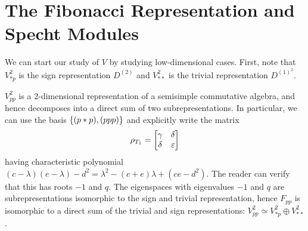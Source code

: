 \documentclass{amsart}
\begin{document}
\section{The Fibonacci Representation and Specht Modules}
We can start our study of $V$ by studying low-dimensional cases.
First, note that $V_{*p}^2$ is the sign representation $D^{(2)}$ and $V_{**}^2$ is the trivial representation $D^{(1)^2}$.

$V_{pp}^2$ is a 2-dimensional representation of a semisimple commutative algebra, and hence decomposes into a direct sum of two subrepresentations.
In particular, we can use the basis $\left\{ (p*p),(ppp) \right\}$ and explicitly write the matrix
\[
  \rho_{T_1} = \begin{bmatrix}
    \gamma & \delta\\
    \delta & \varepsilon
  \end{bmatrix}
\]
having characteristic polynomial $(c - \lambda)(e - \lambda) - d^2 = \lambda^2 - (c + e)\lambda +(ce - d^2)$.
The reader can verify that this has roots $-1$ and $q$.
The eigenspaces with eigenvalues $-1$ and $q$ are subrepresentations isomorphic to the sign and trivial representation, hence $F_{pp}$ is isomorphic to a direct sum of the trivial and sign representations: $V^2_{pp} \simeq V^2_{*p} \oplus V^2_{**}$. 
\end{document}
